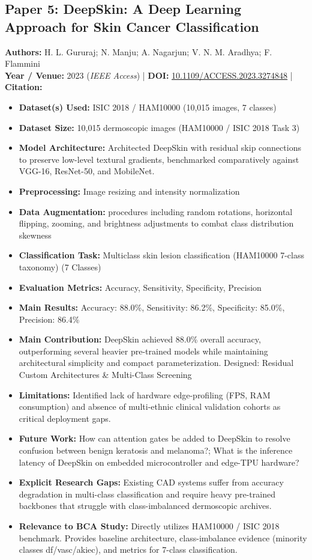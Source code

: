 \documentclass[11pt,a4paper]{article}
\begin{document}
\subsection{Paper 5: DeepSkin: A Deep Learning Approach for Skin Cancer Classification}
\textbf{Authors:} H. L. Gururaj; N. Manju; A. Nagarjun; V. N. M. Aradhya; F. Flammini \\
\textbf{Year / Venue:} 2023 (\textit{IEEE Access}) | \textbf{DOI:} \href{https://doi.org/10.1109/ACCESS.2023.3274848}{10.1109/ACCESS.2023.3274848} | \textbf{Citation:} \cite{10122533}

\begin{itemize}\small
\item \textbf{Dataset(s) Used:} ISIC 2018 / HAM10000 (10,015 images, 7 classes)
\item \textbf{Dataset Size:} 10,015 dermoscopic images (HAM10000 / ISIC 2018 Task 3)
\item \textbf{Model Architecture:} Architected DeepSkin with residual skip connections to preserve low-level textural gradients, benchmarked comparatively against VGG-16, ResNet-50, and MobileNet.
\item \textbf{Preprocessing:} Image resizing and intensity normalization
\item \textbf{Data Augmentation:} procedures including random rotations, horizontal flipping, zooming, and brightness adjustments to combat class distribution skewness
\item \textbf{Classification Task:} Multiclass skin lesion classification (HAM10000 7-class taxonomy) (7 Classes)
\item \textbf{Evaluation Metrics:} Accuracy, Sensitivity, Specificity, Precision
\item \textbf{Main Results:} Accuracy: 88.0\%, Sensitivity: 86.2\%, Specificity: 85.0\%, Precision: 86.4\%
\item \textbf{Main Contribution:} DeepSkin achieved 88.0\% overall accuracy, outperforming several heavier pre-trained models while maintaining architectural simplicity and compact parameterization. Designed: Residual Custom Architectures \& Multi-Class Screening
\item \textbf{Limitations:} Identified lack of hardware edge-profiling (FPS, RAM consumption) and absence of multi-ethnic clinical validation cohorts as critical deployment gaps.
\item \textbf{Future Work:} How can attention gates be added to DeepSkin to resolve confusion between benign keratosis and melanoma?; What is the inference latency of DeepSkin on embedded microcontroller and edge-TPU hardware?
\item \textbf{Explicit Research Gaps:} Existing CAD systems suffer from accuracy degradation in multi-class classification and require heavy pre-trained backbones that struggle with class-imbalanced dermoscopic archives.
\item \textbf{Relevance to BCA Study:} Directly utilizes HAM10000 / ISIC 2018 benchmark. Provides baseline architecture, class-imbalance evidence (minority classes df/vasc/akiec), and metrics for 7-class classification.
\end{itemize}
\end{document}
